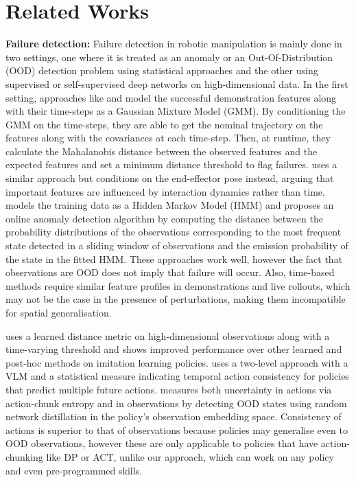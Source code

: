 \documentclass[journal]{IEEEtran}
\begin{document}
\section{Related Works}
\textbf{Failure detection: } Failure detection in robotic manipulation is mainly done in two settings, one where it is treated as an anomaly or an Out-Of-Distribution (OOD) detection problem using statistical approaches and the other using supervised or self-supervised deep networks on high-dimensional data. In the first setting, approaches like \cite{eiband_intuitive_2019} and \cite{willibald_collaborative_2020} model the successful demonstration features along with their time-steps as a Gaussian Mixture Model (GMM). By conditioning the GMM on the time-steps, they are able to get the nominal trajectory on the features along with the covariances at each time-step. Then, at runtime, they calculate the Mahalanobis distance between the observed features and the expected features and set a minimum distance threshold to flag failures. \cite{hierarchical} uses a similar approach but conditions on the end-effector pose instead, arguing that important features are influenced by interaction dynamics rather than time. \cite{10.5555/3398761.3398779} models the training data as a Hidden Markov Model (HMM) and proposes an online anomaly detection algorithm by computing the distance between the probability distributions of the observations corresponding to the most frequent state detected in a sliding window of observations and the emission probability of the state in the fitted HMM. These approaches work well, however the fact that observations are OOD does not imply that failure will occur. Also, time-based methods require similar feature profiles in demonstrations and live rollouts, which may not be the case in the presence of perturbations, making them incompatible for spatial generalisation. 

\cite{xu_can_2025} uses a learned distance metric on high-dimensional observations along with a time-varying threshold and shows improved performance over other learned and post-hoc methods on imitation learning policies. \cite{agia2024unpacking} uses a two-level approach with a VLM and a statistical measure indicating temporal action consistency for policies that predict multiple future actions. \cite{romer2025fiper} measures both uncertainty in actions via action-chunk entropy and in observations by detecting OOD states using random network distillation in the policy's observation embedding space. Consistency of actions is superior to that of observations because policies may generalise even to OOD observations, however these are only applicable to policies that have action-chunking like DP\cite{chi2024diffusionpolicy} or ACT\cite{Zhao-RSS-23}, unlike our approach, which can work on any policy and even pre-programmed skills. 
\end{document}
